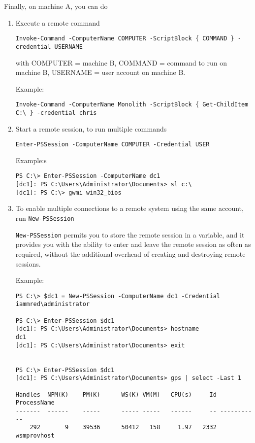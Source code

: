 Finally, on machine A, you can do
\begin{enumerate}
  \item Execute a remote command
\begin{verbatim}
Invoke-Command -ComputerName COMPUTER -ScriptBlock { COMMAND } -credential USERNAME
\end{verbatim}
with COMPUTER = machine B, COMMAND = command to run on machine B, USERNAME = user account on machine B.

Example:
\begin{verbatim}
Invoke-Command -ComputerName Monolith -ScriptBlock { Get-ChildItem C:\ } -credential chris
\end{verbatim}


  \item Start a remote session, to run multiple commands
\begin{verbatim}
Enter-PSSession -ComputerName COMPUTER -Credential USER
\end{verbatim}

Example:s  
\begin{verbatim}
PS C:\> Enter-PSSession -ComputerName dc1
[dc1]: PS C:\Users\Administrator\Documents> sl c:\
[dc1]: PS C:\> gwmi win32_bios

\end{verbatim}

  \item To enable multiple connections to a remote system using the same account, run \verb!New-PSSession!

\verb!New-PSSession! permits you to store the remote session in a variable, and it
provides you with the ability to enter and leave the remote session as often as
required, without the additional overhead of creating and destroying remote
sessions.
  
Example:
\begin{verbatim}
PS C:\> $dc1 = New-PSSession -ComputerName dc1 -Credential iammred\administrator

PS C:\> Enter-PSSession $dc1
[dc1]: PS C:\Users\Administrator\Documents> hostname
dc1
[dc1]: PS C:\Users\Administrator\Documents> exit


PS C:\> Enter-PSSession $dc1
[dc1]: PS C:\Users\Administrator\Documents> gps | select -Last 1

Handles  NPM(K)    PM(K)      WS(K) VM(M)   CPU(s)     Id ProcessName
-------  ------    -----      ----- -----   ------     -- -----------
    292       9    39536      50412   158     1.97   2332 wsmprovhost


\end{verbatim}
\end{enumerate}
